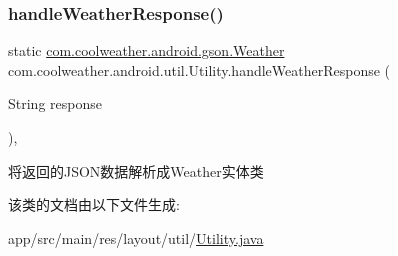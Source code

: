\subsubsection{\texorpdfstring{handleWeatherResponse()}{handleWeatherResponse()}}
{\footnotesize\ttfamily static \mbox{\hyperlink{classcom_1_1coolweather_1_1android_1_1gson_1_1_weather}{com.\+coolweather.\+android.\+gson.\+Weather}} com.\+coolweather.\+android.\+util.\+Utility.\+handle\+Weather\+Response (\begin{DoxyParamCaption}\item[{String}]{response }\end{DoxyParamCaption})\hspace{0.3cm}{\ttfamily [inline]}, {\ttfamily [static]}}

将返回的\+J\+S\+O\+N数据解析成\+Weather实体类 

该类的文档由以下文件生成\+:\begin{DoxyCompactItemize}
\item 
app/src/main/res/layout/util/\mbox{\hyperlink{res_2layout_2util_2_utility_8java}{Utility.\+java}}\end{DoxyCompactItemize}
